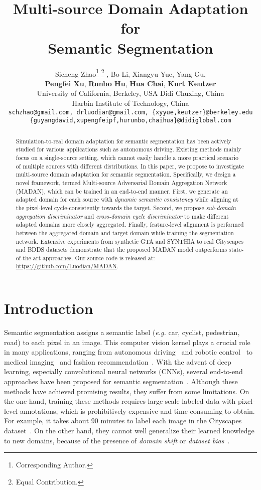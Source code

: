 \documentclass{article}
\title{Multi-source Domain Adaptation for \\Semantic Segmentation}
\author{Sicheng Zhao\thanks{Corresponding Author.} \thanks{Equal Contribution.} , Bo Li, Xiangyu Yue, Yang Gu,\\
  \textbf{Pengfei Xu}, \textbf{Runbo Hu}, \textbf{Hua Chai}, \textbf{Kurt Keutzer}\\
University of California, Berkeley, USA  Didi Chuxing, China\\
  Harbin Institute of Technology, China\\
  \texttt{schzhao@gmail.com, drluodian@gmail.com, \{xyyue,keutzer\}@berkeley.edu} \\
  \texttt{\{guyangdavid,xupengfeipf,hurunbo,chaihua\}@didiglobal.com}\\
}
\begin{document}
\maketitle

\begin{abstract}
Simulation-to-real domain adaptation for semantic segmentation has been actively studied for various applications such as autonomous driving. Existing methods mainly focus on a single-source setting, which cannot easily handle a more practical scenario of multiple sources with different distributions. In this paper, we propose to investigate multi-source domain adaptation for semantic segmentation. Specifically, we design a novel framework, termed Multi-source Adversarial Domain Aggregation Network (MADAN), which can be trained in an end-to-end manner. First, we generate an adapted domain for each source with \textit{dynamic semantic consistency} while aligning at the pixel-level cycle-consistently towards the target. Second, we propose \textit{sub-domain aggregation discriminator} and \textit{cross-domain cycle discriminator} to make different adapted domains more closely aggregated. Finally, feature-level alignment is performed between the aggregated domain and target domain while training the segmentation network. Extensive experiments from synthetic GTA and SYNTHIA to real Cityscapes and BDDS datasets demonstrate that the proposed MADAN model outperforms state-of-the-art approaches.  Our source code is released at: \url{https://github.com/Luodian/MADAN}.
\end{abstract}


\section{Introduction}
Semantic segmentation assigns a semantic label (\textit{e.g.} car, cyclist, pedestrian, road) to each pixel in an image. This computer vision kernel plays a crucial role in many applications, ranging from autonomous driving~\cite{geiger2012we} and robotic control~\cite{hong2018virtual} to medical imaging~\cite{cciccek20163d} and fashion recommendation~\cite{jaradat2017deep}. With the advent of deep learning, especially convolutional neural networks (CNNs), several end-to-end approaches have been proposed for semantic segmentation~\cite{long2015fully,liu2015semantic,zheng2015conditional,lin2016efficient,yu2016multi,badrinarayanan2017segnet,zhao2017pyramid,chen2017deeplab,wang2018understanding,zhou2019semantic}. Although these methods have achieved promising results, they suffer from some limitations. On the one hand, training these methods requires large-scale labeled data with pixel-level annotations, which is prohibitively expensive and time-consuming to obtain. For example, it takes about 90 minutes to label each image in the Cityscapes dataset~\cite{cordts2016cityscapes}. On the other hand, they cannot well generalize their learned knowledge to new domains, because of the presence of \emph{domain shift} or \emph{dataset bias}~\cite{torralba2011unbiased,wu2019squeezesegv2}.
\end{document}
